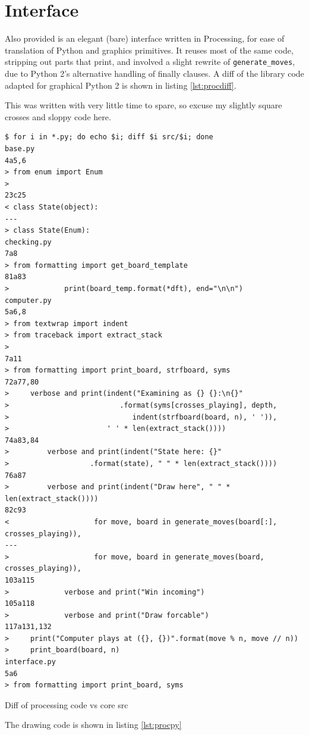 \documentclass[a4paper,11pt]{article}
\newenvironment{longlisting}
{\addvspace{\baselineskip}\captionsetup{type=listing}}
{\addvspace{\baselineskip}}
\begin{document}
    \section{Interface}

    Also provided is an elegant (bare) interface written in Processing, for ease
    of translation of Python and graphics primitives. It reuses most of the same
    code, stripping out parts that print, and involved a slight rewrite of
    \texttt{generate\_moves}, due to Python 2's alternative handling of finally
    clauses. A diff of the library code adapted for graphical Python 2 is shown
    in listing \ref{lst:procdiff}.

    This was written with very little time to spare, so excuse my slightly
    square crosses and sloppy code here.

\begin{longlisting}
\begin{verbatim}
$ for i in *.py; do echo $i; diff $i src/$i; done
base.py
4a5,6
> from enum import Enum
>
23c25
< class State(object):
---
> class State(Enum):
checking.py
7a8
> from formatting import get_board_template
81a83
>             print(board_temp.format(*dft), end="\n\n")
computer.py
5a6,8
> from textwrap import indent
> from traceback import extract_stack
>
7a11
> from formatting import print_board, strfboard, syms
72a77,80
>     verbose and print(indent("Examining as {} {}:\n{}"
>                          .format(syms[crosses_playing], depth,
>                             indent(strfboard(board, n), ' ')),
>                       ' ' * len(extract_stack())))
74a83,84
>         verbose and print(indent("State here: {}"
>                   .format(state), " " * len(extract_stack())))
76a87
>         verbose and print(indent("Draw here", " " * len(extract_stack())))
82c93
<                    for move, board in generate_moves(board[:], crosses_playing)),
---
>                    for move, board in generate_moves(board, crosses_playing)),
103a115
>             verbose and print("Win incoming")
105a118
>             verbose and print("Draw forcable")
117a131,132
>     print("Computer plays at ({}, {})".format(move % n, move // n))
>     print_board(board, n)
interface.py
5a6
> from formatting import print_board, syms
\end{verbatim}
\caption{Diff of processing code vs core src}\label{lst:procdiff}
\end{longlisting}

    The drawing code is shown in listing \ref{lst:procpy}
\end{document}
